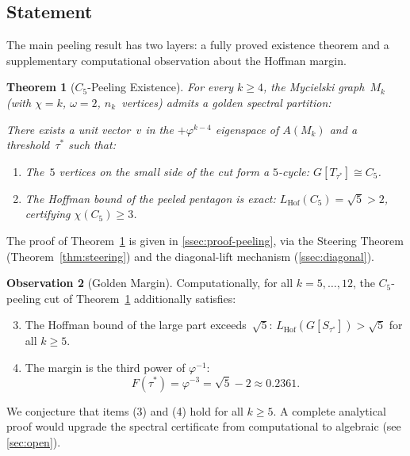 \documentclass[11pt,a4paper]{amsart}
\theoremstyle{plain}
\newtheorem{theorem}{Theorem}[section]
\theoremstyle{definition}
\newtheorem{observation}[theorem]{Observation}
\theoremstyle{remark}
\newcommand{\vp}{\varphi}
\newcommand{\chr}{\chi}
\newcommand{\om}{\omega}
\newcommand{\LHof}{L_{\mathrm{Hof}}}
\begin{document}
\subsection{Statement}\label{ssec:c5-peeling}

The main peeling result has two layers: a fully proved existence theorem and a
supplementary computational observation about the Hoffman margin.

\begin{theorem}[$C_5$-Peeling Existence]\label{thm:c5-peeling}
For every $k \geq 4$, the Mycielski graph~$M_k$ (with $\chr = k$, $\om = 2$,
$n_k$~vertices) admits a \emph{golden spectral partition}:

There exists a unit vector~$v$ in the $+\vp^{k-4}$ eigenspace of $A(M_k)$ and
a threshold~$\tau^*$ such that:
\begin{enumerate}[\upshape(1)]
\item The~$5$ vertices on the small side of the cut form a $5$-cycle:
  $G[T_{\tau^*}] \cong C_5$.
\item The Hoffman bound of the peeled pentagon is exact:
  $\LHof(C_5) = \sqrt{5} > 2$, certifying $\chr(C_5) \geq 3$.
\end{enumerate}
\end{theorem}

The proof of Theorem~\ref{thm:c5-peeling} is given in \cref{ssec:proof-peeling}, via
the Steering Theorem (Theorem~\ref{thm:steering}) and the diagonal-lift mechanism
(\cref{ssec:diagonal}).

\begin{observation}[Golden Margin]\label{obs:margin}
Computationally, for all $k = 5,\ldots,12$, the $C_5$-peeling cut of
Theorem~\ref{thm:c5-peeling} additionally satisfies:
\begin{enumerate}[\upshape(1)]
\setcounter{enumi}{2}
\item The Hoffman bound of the large part exceeds~$\sqrt{5}$:
  $\LHof(G[S_{\tau^*}]) > \sqrt{5}$ for all $k \geq 5$.
\item The margin is the third power of $\vp^{-1}$:
  \begin{equation}\label{eq:margin}
    F(\tau^*) = \vp^{-3} = \sqrt{5} - 2 \approx 0.2361.
  \end{equation}
\end{enumerate}
We conjecture that items (3) and (4) hold for all $k \geq 5$.  A complete
analytical proof would upgrade the spectral certificate from computational to
algebraic (see \cref{sec:open}).
\end{observation}
\end{document}
